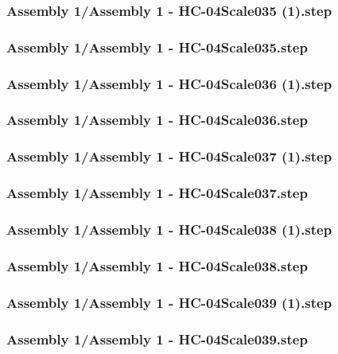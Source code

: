 \documentclass[a4paper,12pt]{article}
\begin{document}
\begin{lstlising}[language=C++]
\subsubsection{Assembly 1/Assembly 1 - HC-04Scale035 (1).step}

\subsubsection{Assembly 1/Assembly 1 - HC-04Scale035.step}

\subsubsection{Assembly 1/Assembly 1 - HC-04Scale036 (1).step}

\subsubsection{Assembly 1/Assembly 1 - HC-04Scale036.step}

\subsubsection{Assembly 1/Assembly 1 - HC-04Scale037 (1).step}

\subsubsection{Assembly 1/Assembly 1 - HC-04Scale037.step}

\subsubsection{Assembly 1/Assembly 1 - HC-04Scale038 (1).step}

\subsubsection{Assembly 1/Assembly 1 - HC-04Scale038.step}

\subsubsection{Assembly 1/Assembly 1 - HC-04Scale039 (1).step}

\subsubsection{Assembly 1/Assembly 1 - HC-04Scale039.step}


\end{lstlising}
\end{document}
